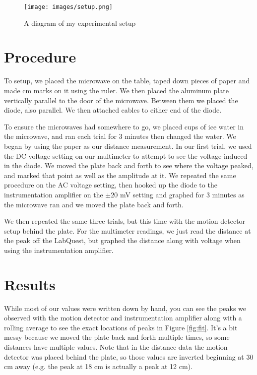 \documentclass[12pt,letterpaper]{article}
\begin{document}
\begin{figure}[h]
    \centering
    \texttt{[image: images/setup.png]}
    \caption{A diagram of my experimental setup}
    \label{fig:setup}
\end{figure}

\section{Procedure}

To setup, we placed the microwave on the table, taped down pieces of paper and made cm marks on it using the ruler. We then placed the aluminum plate vertically parallel to the door of the microwave. Between them we placed the diode, also parallel. We then attached cables to either end of the diode.

To ensure the microwaves had somewhere to go, we placed cups of ice water in the microwave, and ran each trial for 3 minutes then changed the water. We began by using the paper as our distance measurement. In our first trial, we used the DC voltage setting on our multimeter to attempt to see the voltage induced in the diode. We moved the plate back and forth to see where the voltage peaked, and marked that point as well as the amplitude at it. We repeated the same procedure on the AC voltage setting, then hooked up the diode to the instrumentation amplifier on the $\pm 20$ mV setting and graphed for 3 minutes as the microwave ran and we moved the plate back and forth.

We then repeated the same three trials, but this time with the motion detector setup behind the plate. For the multimeter readings, we just read the distance at the peak off the LabQuest, but graphed the distance along with voltage when using the instrumentation amplifier.

\section{Results}

While most of our values were written down by hand, you can see the peaks we observed with the motion detector and instrumentation amplifier along with a rolling average to see the exact locations of peaks in Figure \ref{fig:fit}. It's a bit messy because we moved the plate back and forth multiple times, so some distances have multiple values. Note that in the distance data the motion detector was placed behind the plate, so those values are inverted beginning at 30 cm away (e.g. the peak at 18 cm is actually a peak at 12 cm).
\end{document}
